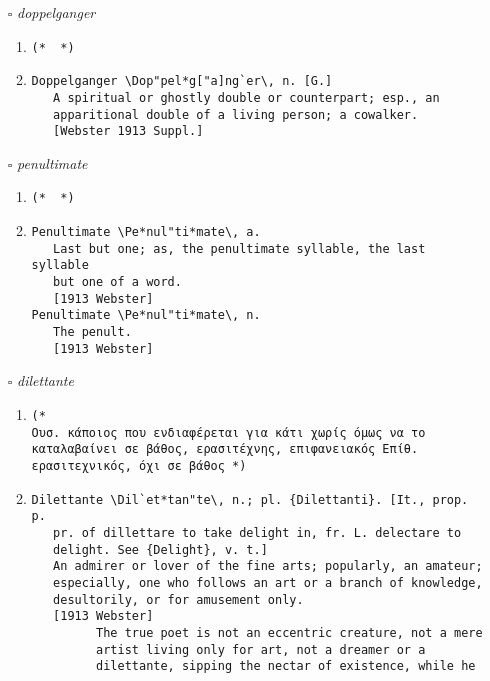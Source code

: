 \documentclass{article}
\begin{document}
\begin{itemize}
\begin{enumerate}
{\begin{lstlisting}
\end{lstlisting}}
\end{enumerate}
\item[$\square$] \emph{ doppelganger }
\begin{enumerate}
\item{
\begin{lstlisting}
(*  *)
\end{lstlisting}}
\item{
\begin{lstlisting}
Doppelganger \Dop"pel*g["a]ng`er\, n. [G.]
   A spiritual or ghostly double or counterpart; esp., an
   apparitional double of a living person; a cowalker.
   [Webster 1913 Suppl.]
\end{lstlisting}}
\end{enumerate}
\item[$\square$] \emph{ penultimate }
\begin{enumerate}
\item{
\begin{lstlisting}
(*  *)
\end{lstlisting}}
\item{
\begin{lstlisting}
Penultimate \Pe*nul"ti*mate\, a.
   Last but one; as, the penultimate syllable, the last syllable
   but one of a word.
   [1913 Webster]
Penultimate \Pe*nul"ti*mate\, n.
   The penult.
   [1913 Webster]
\end{lstlisting}}
\end{enumerate}
\item[$\square$] \emph{ dilettante }
\begin{enumerate}
\item{
\begin{lstlisting}
(* 
Ουσ. κάποιος που ενδιαφέρεται για κάτι χωρίς όμως να το καταλαβαίνει σε βάθος, ερασιτέχνης, επιφανειακός Επίθ. ερασιτεχνικός, όχι σε βάθος *)
\end{lstlisting}}
\item{
\begin{lstlisting}
Dilettante \Dil`et*tan"te\, n.; pl. {Dilettanti}. [It., prop. p.
   pr. of dillettare to take delight in, fr. L. delectare to
   delight. See {Delight}, v. t.]
   An admirer or lover of the fine arts; popularly, an amateur;
   especially, one who follows an art or a branch of knowledge,
   desultorily, or for amusement only.
   [1913 Webster]
         The true poet is not an eccentric creature, not a mere
         artist living only for art, not a dreamer or a
         dilettante, sipping the nectar of existence, while he

\end{lstlisting}}
\end{enumerate}
\end{itemize}
\end{document}
